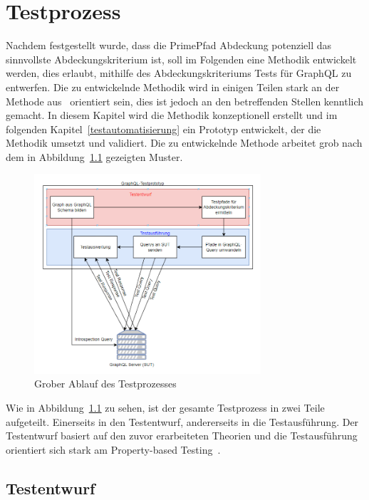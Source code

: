 \chapter{Testprozess}
\label{testentwurf}

Nachdem festgestellt wurde, dass die PrimePfad Abdeckung potenziell das sinnvollste Abdeckungskriterium ist, soll im Folgenden eine
Methodik entwickelt werden, dies erlaubt, mithilfe des Abdeckungskriteriums Tests für GraphQL zu entwerfen.
Die zu entwickelnde Methodik wird in einigen Teilen stark an der Methode aus~\cite{property-based-testing} orientiert sein, dies ist jedoch an den betreffenden Stellen kenntlich gemacht.
In diesem Kapitel wird die Methodik konzeptionell erstellt und im folgenden Kapitel~\ref{testautomatisierung} ein Prototyp entwickelt, der
die Methodik umsetzt und validiert.
Die zu entwickelnde Methode arbeitet grob nach dem in Abbildung~\ref{methodeablauf} gezeigten Muster.

\begin{figure}[H]
    \centering
    \includegraphics[width=0.75\textwidth,keepaspectratio]{img/fktweiseprototyp}
    \caption{Grober Ablauf des Testprozesses}
    \label{methodeablauf}
\end{figure}

Wie in Abbildung~\ref{methodeablauf} zu sehen, ist der gesamte Testprozess in zwei Teile aufgeteilt.
Einerseits in den Testentwurf, andererseits in die Testausführung.
Der Testentwurf basiert auf den zuvor erarbeiteten Theorien und die Testausführung orientiert sich stark am
Property-based Testing~\cite[vgl. Method]{property-based-testing}.

\section{Testentwurf}


